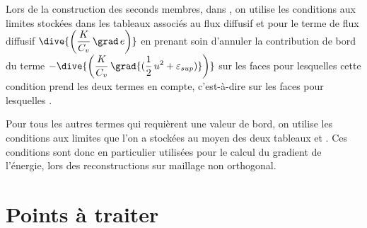 Lors de la construction des seconds membres, dans , on utilise les
conditions aux limites stockées dans les tableaux associés au flux
diffusif
 et
 pour le terme de flux diffusif
$\displaystyle\dive{\left(\frac{K}{C_v}\,\grad\,e\right)}$
en prenant soin d'annuler la contribution de bord du terme
$\displaystyle-\dive{\left(\frac{K}{C_v}\,\grad{(\frac{1}{2}\,u^2+\varepsilon_{sup})}\right)}$
sur les faces pour lesquelles cette condition
prend les deux termes en compte, c'est-à-dire sur les faces pour lesquelles
.

Pour tous les autres termes qui requièrent une valeur de bord, on utilise les
conditions aux limites que l'on a stockées au moyen des deux tableaux
 et
. Ces conditions sont
donc en particulier utilisées pour le calcul du gradient de l'énergie,
lors des reconstructions sur maillage non orthogonal.


\newpage
\section*{Points à traiter}
\label{Cfbl_Cfxtcl_prg_a_traiter}%


